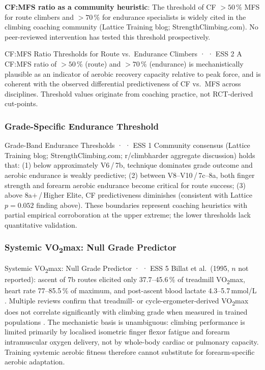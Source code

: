 \textbf{CF:MFS ratio as a community heuristic}: The threshold of CF $> 50\,\%$ MFS for route climbers and $> 70\,\%$ for endurance specialists is widely cited in the climbing coaching community (Lattice Training blog; StrengthClimbing.com).
No peer-reviewed intervention has tested this threshold prospectively.

\begin{bioplausbox}{CF:MFS Ratio Thresholds for Route vs.\ Endurance Climbers · \bioplausible · ESS 2}
A CF:MFS ratio of $> 50\,\%$ (route) and $> 70\,\%$ (endurance) is mechanistically plausible as an indicator of aerobic recovery capacity relative to peak force, and is coherent with the observed differential predictiveness of CF vs.\ MFS across disciplines.
Threshold values originate from coaching practice, not RCT-derived cut-points.\singlesource
\end{bioplausbox}

\subsubsection{Grade-Specific Endurance Threshold}

\begin{folklorebox}{Grade-Band Endurance Thresholds · \folkloreverified · ESS 1}
Community consensus (Lattice Training blog; StrengthClimbing.com; r/climbharder aggregate discussion) holds that:
(1) below approximately V6\,/\,7b, technique dominates grade outcome and aerobic endurance is weakly predictive;
(2) between V8--V10\,/\,7c--8a, both finger strength and forearm aerobic endurance become critical for route success;
(3) above 8a$+$\,/\,Higher Elite, CF predictiveness diminishes (consistent with Lattice $p = 0.052$ finding above).
These boundaries represent coaching heuristics with partial empirical corroboration at the upper extreme; the lower thresholds lack quantitative validation.
\end{folklorebox}

\subsubsection{Systemic VO\textsubscript{2}max: Null Grade Predictor}

\begin{evidencebox}{Systemic VO\textsubscript{2}max: Null Grade Predictor · \evidencebacked · ESS 5}
Billat et al.\ (1995, $n$ not reported): ascent of 7b routes elicited only 37.7--45.6\,\% of treadmill VO\textsubscript{2}max, heart rate 77--85.5\,\% of maximum, and post-ascent blood lactate 4.3--5.7\,mmol/L \cite{TEMP_Billat1995}.
Multiple reviews confirm that treadmill- or cycle-ergometer-derived VO\textsubscript{2}max does not correlate significantly with climbing grade when measured in trained populations \cite{Wat04}.
The mechanistic basis is unambiguous: climbing performance is limited primarily by localised isometric finger flexor fatigue and forearm intramuscular oxygen delivery, not by whole-body cardiac or pulmonary capacity.
Training systemic aerobic fitness therefore cannot substitute for forearm-specific aerobic adaptation.
\end{evidencebox}

